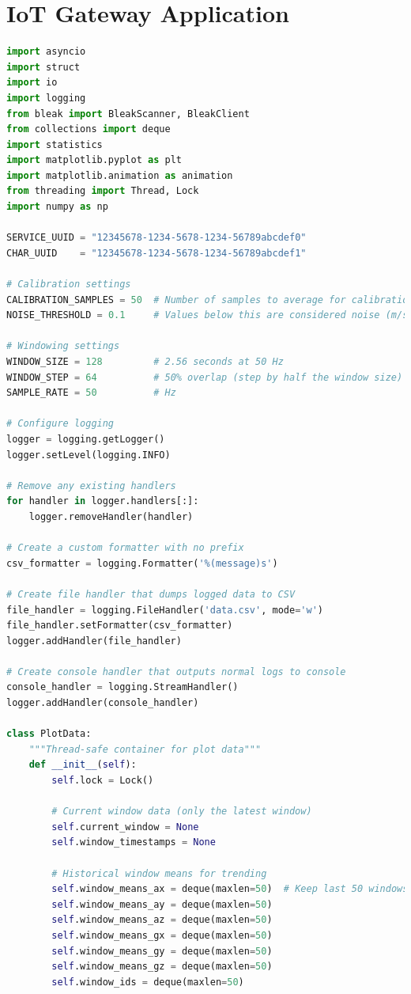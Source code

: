 \documentclass[conference]{IEEEtran}
\begin{document}
\section{IoT Gateway Application}\label{gateway_firmware}
\begin{lstlisting}[language=Python]
import asyncio
import struct
import io
import logging
from bleak import BleakScanner, BleakClient
from collections import deque
import statistics
import matplotlib.pyplot as plt
import matplotlib.animation as animation
from threading import Thread, Lock
import numpy as np

SERVICE_UUID = "12345678-1234-5678-1234-56789abcdef0"
CHAR_UUID    = "12345678-1234-5678-1234-56789abcdef1"

# Calibration settings
CALIBRATION_SAMPLES = 50  # Number of samples to average for calibration
NOISE_THRESHOLD = 0.1     # Values below this are considered noise (m/s^2 or dps)

# Windowing settings
WINDOW_SIZE = 128         # 2.56 seconds at 50 Hz
WINDOW_STEP = 64          # 50% overlap (step by half the window size)
SAMPLE_RATE = 50          # Hz

# Configure logging
logger = logging.getLogger()
logger.setLevel(logging.INFO)

# Remove any existing handlers
for handler in logger.handlers[:]:
    logger.removeHandler(handler)

# Create a custom formatter with no prefix
csv_formatter = logging.Formatter('%(message)s')

# Create file handler that dumps logged data to CSV
file_handler = logging.FileHandler('data.csv', mode='w')
file_handler.setFormatter(csv_formatter)
logger.addHandler(file_handler)

# Create console handler that outputs normal logs to console
console_handler = logging.StreamHandler()
logger.addHandler(console_handler)

class PlotData:
    """Thread-safe container for plot data"""
    def __init__(self):
        self.lock = Lock()
        
        # Current window data (only the latest window)
        self.current_window = None
        self.window_timestamps = None
        
        # Historical window means for trending
        self.window_means_ax = deque(maxlen=50)  # Keep last 50 windows
        self.window_means_ay = deque(maxlen=50)
        self.window_means_az = deque(maxlen=50)
        self.window_means_gx = deque(maxlen=50)
        self.window_means_gy = deque(maxlen=50)
        self.window_means_gz = deque(maxlen=50)
        self.window_ids = deque(maxlen=50)
        

\end{lstlisting}
\end{document}
